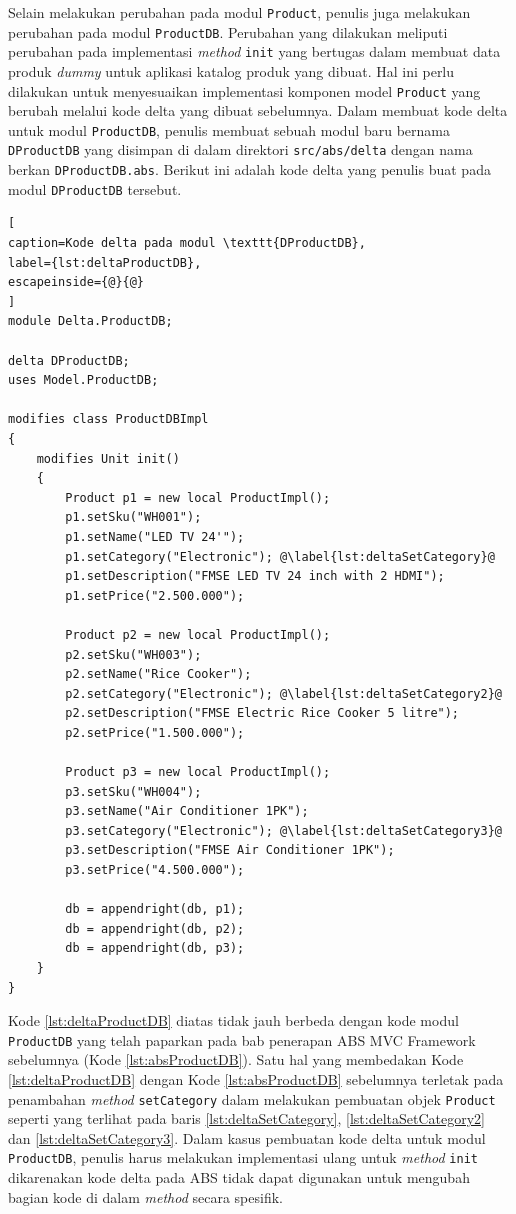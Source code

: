 Selain melakukan perubahan pada modul \texttt{Product}, penulis juga melakukan perubahan pada modul \texttt{ProductDB}. Perubahan yang dilakukan meliputi perubahan pada implementasi \textit{method} \texttt{init} yang bertugas dalam membuat data produk \textit{dummy} untuk aplikasi katalog produk yang dibuat. Hal ini perlu dilakukan untuk menyesuaikan implementasi komponen model \texttt{Product} yang berubah melalui kode delta yang dibuat sebelumnya. Dalam membuat kode delta untuk modul \texttt{ProductDB}, penulis membuat sebuah modul baru bernama \texttt{DProductDB} yang disimpan di dalam direktori \texttt{src/abs/delta} dengan nama berkan \texttt{DProductDB.abs}. Berikut ini adalah kode delta yang penulis buat pada modul \texttt{DProductDB} tersebut.

\begin{lstlisting}[
caption=Kode delta pada modul \texttt{DProductDB},
label={lst:deltaProductDB},
escapeinside={@}{@}
]
module Delta.ProductDB;

delta DProductDB;
uses Model.ProductDB;

modifies class ProductDBImpl
{
	modifies Unit init()
	{
		Product p1 = new local ProductImpl();
		p1.setSku("WH001");
		p1.setName("LED TV 24'");
		p1.setCategory("Electronic"); @\label{lst:deltaSetCategory}@
		p1.setDescription("FMSE LED TV 24 inch with 2 HDMI");
		p1.setPrice("2.500.000");

		Product p2 = new local ProductImpl();
		p2.setSku("WH003");
		p2.setName("Rice Cooker");
		p2.setCategory("Electronic"); @\label{lst:deltaSetCategory2}@
		p2.setDescription("FMSE Electric Rice Cooker 5 litre");
		p2.setPrice("1.500.000");
		
		Product p3 = new local ProductImpl();
		p3.setSku("WH004");
		p3.setName("Air Conditioner 1PK");
		p3.setCategory("Electronic"); @\label{lst:deltaSetCategory3}@
		p3.setDescription("FMSE Air Conditioner 1PK");
		p3.setPrice("4.500.000");
		
		db = appendright(db, p1);
		db = appendright(db, p2);
		db = appendright(db, p3);
	}
}
\end{lstlisting}

Kode \ref{lst:deltaProductDB} diatas tidak jauh berbeda dengan kode modul \texttt{ProductDB} yang telah paparkan pada bab penerapan ABS MVC Framework sebelumnya (Kode \ref{lst:absProductDB}). Satu hal yang membedakan Kode \ref{lst:deltaProductDB} dengan Kode \ref{lst:absProductDB} sebelumnya terletak pada penambahan \textit{method} \texttt{setCategory} dalam melakukan pembuatan objek \texttt{Product} seperti yang terlihat pada baris \ref{lst:deltaSetCategory}, \ref{lst:deltaSetCategory2} dan \ref{lst:deltaSetCategory3}. Dalam kasus pembuatan kode delta untuk modul \texttt{ProductDB}, penulis harus melakukan implementasi ulang untuk \textit{method} \texttt{init} dikarenakan kode delta pada ABS tidak dapat digunakan untuk mengubah bagian kode di dalam \textit{method} secara spesifik.

